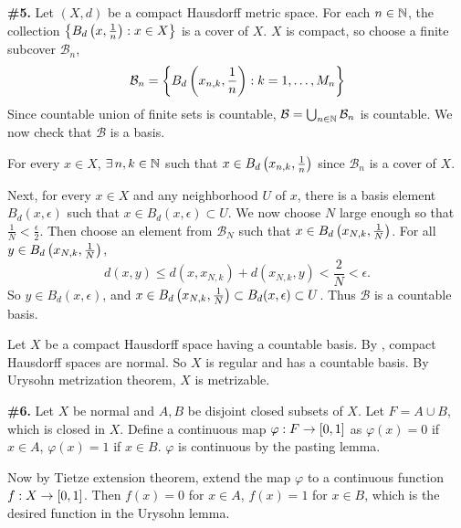 \documentclass[a4paper,11pt]{article}
\newcommand{\B}{\mathcal{B}}
\begin{document}
\begin{minipage}[t][270mm]{90mm}
    {\bfseries \large \#5.} \note{\mimp} Let \((X, d)\) be a compact Hausdorff metric space. For each \(n \in \mathbb{N}\), the collection \(\left\{B_d\left( x, \frac{1}{n} \right) : x \in X\right\}\) is a cover of \(X\). \(X\) is compact, so choose a finite subcover \(\B_n\),
    \[
        \B_n = \left\{B_d\paren{x_{n, k}, \frac{1}{n}} : k = 1, \dots, M_n\right\}
    \]
    Since countable union of finite sets is countable, \(\B = \bigcup_{n \in \N} \B_n\) is countable. We now check that \(\B\) is a basis.

    For every \(x \in X\), \(\exists n, k \in \N\) such that \(x \in B_d\left( x_{n, k}, \frac{1}{n} \right)\) since \(\B_n\) is a cover of \(X\).

    Next, for every \(x \in X\) and any neighborhood \(U\) of \(x\), there is a basis element \(B_d(x, \epsilon)\) such that \(x \in B_d(x, \epsilon) \subset U\). We now choose \(N\) large enough so that \(\frac{1}{N} < \frac{\epsilon}{2}\). Then choose an element from \(\B_N\) such that \(x \in B_d\left( x_{N, k}, \frac{1}{N} \right)\). For all \(y \in B_d\left( x_{N, k}, \frac{1}{N} \right)\),
    \[
        d(x, y) \leq d(x, x_{N, k}) + d(x_{N, k}, y) < \frac{2}{N} < \epsilon.
    \]
    So \(y \in B_d(x, \epsilon)\), and \(x \in B_d\left( x_{N, k}, \frac{1}{N} \right) \subset B_d(x, \epsilon) \subset U\). Thus \(\B\) is a countable basis.

    \note{\mimpd} Let \(X\) be a compact Hausdorff space having a countable basis. By , compact Hausdorff spaces are normal. So \(X\) is regular and has a countable basis. By Urysohn metrization theorem, \(X\) is metrizable.

\end{minipage}
{\color{gray}\vline}
\begin{minipage}[t][270mm]{90mm}
    \phantom{?}
\end{minipage}

\newpage

\phantom{?}
\vspace{5mm}

\begin{minipage}[t][270mm]{90mm}
    {\bfseries \large \#6.} Let \(X\) be normal and \(A, B\) be disjoint closed subsets of \(X\). Let \(F = A\cup B\), which is closed in \(X\). Define a continuous map \(\varphi : F \rightarrow [0, 1]\) as \(\varphi(x) = 0\) if \(x \in A\), \(\varphi(x) = 1\) if \(x \in B\). \(\varphi\) is continuous by the pasting lemma.

    Now by Tietze extension theorem, extend the map \(\varphi\) to a continuous function \(f : X \rightarrow [0, 1]\). Then \(f(x) = 0\) for \(x \in A\), \(f(x) = 1\) for \(x \in B\), which is the desired function in the Urysohn lemma.

\end{minipage}
{\color{gray}\vline}
\begin{minipage}[t][270mm]{90mm}
    \phantom{?}
\end{minipage}
\end{document}
